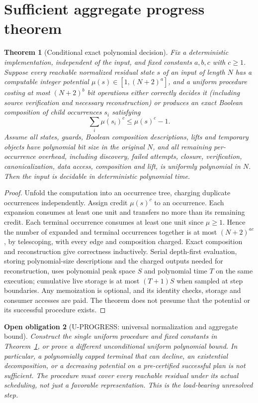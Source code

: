 \documentclass[11pt]{article}
\newtheorem{theorem}{Theorem}
\newtheorem{obligation}[theorem]{Open obligation}
\begin{document}
\section{Sufficient aggregate progress theorem}\label{sec:aggregate}
\begin{theorem}[Conditional exact polynomial decision]\label{thm:aggregate}
Fix a deterministic implementation, independent of the input, and fixed constants $a,b,c$ with $c\ge1$. Suppose every reachable normalized residual state $s$ of an input of length $N$ has a computable integer potential $\mu(s)\in[1,(N+2)^a]$, and a uniform procedure costing at most $(N+2)^b$ bit operations either correctly decides it (including source verification and necessary reconstruction) or produces an exact Boolean composition of child occurrences $s_i$ satisfying
\[
\sum_i \mu(s_i)^c\le \mu(s)^c-1 .
\]
Assume all states, guards, Boolean composition descriptions, lifts and temporary objects have polynomial bit size in the original $N$, and all remaining per-occurrence overhead, including discovery, failed attempts, closure, verification, canonicalization, data access, composition and lift, is uniformly polynomial in $N$. Then the input is decidable in deterministic polynomial time.
\end{theorem}
\begin{proof}
Unfold the computation into an occurrence tree, charging duplicate occurrences independently. Assign credit $\mu(s)^c$ to an occurrence. Each expansion consumes at least one unit and transfers no more than its remaining credit. Each terminal occurrence consumes at least one unit since $\mu\ge1$. Hence the number of expanded and terminal occurrences together is at most $(N+2)^{ac}$, by telescoping, with every edge and composition charged. Exact composition and reconstruction give correctness inductively. Serial depth-first evaluation, storing polynomial-size descriptions and the charged outputs needed for reconstruction, uses polynomial peak space $S$ and polynomial time $T$ on the same execution; cumulative live storage is at most $(T+1)S$ when sampled at step boundaries. Any memoization is optional, and its identity checks, storage and consumer accesses are paid. The theorem does not presume that the potential or its successful procedure exists.
\end{proof}
\begin{obligation}[U-PROGRESS: universal normalization and aggregate bound]\label{obl:progress}
Construct the single uniform procedure and fixed constants in Theorem~\ref{thm:aggregate}, or prove a different unconditional uniform polynomial bound. In particular, a polynomially capped terminal that can decline, an existential decomposition, or a decreasing potential on a pre-certified successful plan is not sufficient. The procedure must cover every reachable residual under its actual scheduling, not just a favorable representation. This is the load-bearing unresolved step.
\end{obligation}
\end{document}
